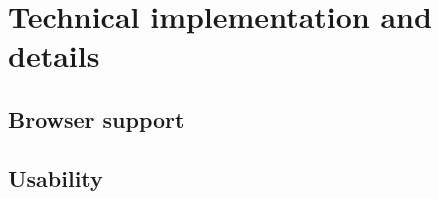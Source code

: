\section{Technical implementation and details}

\subsection{Browser support}

\subsection{Usability}